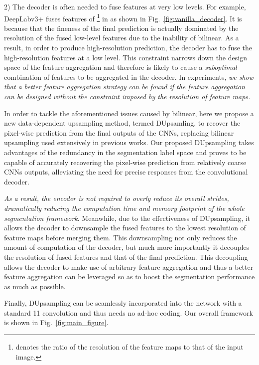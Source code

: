 \documentclass[10pt,twocolumn,letterpaper]{article}
\newcommand{\1}{{\mathbbm{1}}}
\begin{document}
2) The decoder is often needed  to fuse features at  very low levels. For example, DeepLabv3+ fuses features of \footnote{ denotes the ratio of the resolution of the feature maps to that of the input image.} in
   as shown in Fig.~\ref{fig:vanilla_decoder}. It is because that the fineness of the final prediction is actually dominated by the resolution of the fused low-level features due to the inability of bilinear. As a result, in order to produce high-resolution prediction, the decoder has to fuse the high-resolution features at a low level. This constraint narrows down the design space of the feature aggregation and therefore is likely to cause a {\it suboptimal} combination of features to be aggregated  in the decoder. In experiments, {\em we show that a better feature aggregation strategy can be found if the feature aggregation can be designed without the constraint imposed by the resolution of feature maps.
}



In order to tackle the aforementioned issues caused by bilinear, here we propose a new data-dependent upsampling method, termed DUpsamling,
to recover the pixel-wise prediction from the final outputs of the CNNs, replacing bilinear upsampling used extensively in previous works. Our proposed DUpsampling takes advantages of the redundancy in the segmentation label space and proves to be capable of accurately recovering the pixel-wise prediction from relatively coarse CNNs outputs, alleviating the need for precise responses from the convolutional decoder.

{\em As a result, the encoder is not required to overly reduce its overall strides, dramatically reducing the computation time and memory footprint of the whole segmentation framework}. Meanwhile, due to the effectiveness of DUpsampling, it allows the decoder to downsample the fused features to the lowest resolution of feature maps before merging them. This downsampling not only reduces the amount of computation of the decoder, but much more importantly it decouples the resolution of fused features and that of the final prediction. This decoupling allows the decoder to make use of arbitrary  feature aggregation and thus a better feature aggregation can be leveraged so as to boost the  segmentation performance as much as possible.

Finally, DUpsampling can be seamlessly incorporated into the network with a standard 11 convolution and thus needs no ad-hoc coding. Our overall framework is shown in Fig.~\ref{fig:main_figure}.
\end{document}
